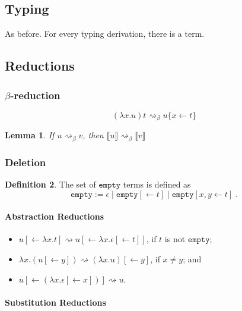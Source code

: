 \documentclass[11pt,a4paper]{article}
\theoremstyle{definition}
\newtheorem{definition}{Definition}
\theoremstyle{plain}
\newtheorem{lemma}[definition]{Lemma}
\theoremstyle{remark}
\begin{document}
\subsection{Typing}

As before. For every typing derivation, there is a term.

\subsection{Reductions}

\subsubsection{$\beta$-reduction}

\[
(\lambda x.u)t \rightsquigarrow_\beta u\{x\leftarrow t\}
\]


\begin{lemma}
	If $u\rightsquigarrow_\beta v$, then $\llbracket u\rrbracket \rightsquigarrow_\beta\llbracket v\rrbracket$
\end{lemma}

\subsubsection{Deletion}

\newcommand{\tempty}{{\mathtt{empty}}}

\begin{definition}
	The set of $\tempty$ terms is defined as
	\[\tempty:=\epsilon\;|\;\tempty[\leftarrow t]\;|\;\tempty[x,y\leftarrow t]\;.\]
\end{definition}

\paragraph{Abstraction Reductions}

\begin{itemize}
	\item $u[\leftarrow\lambda x.t]\rightsquigarrow u[\leftarrow\lambda x.\epsilon[\leftarrow t]]$, if $t$ is not $\tempty$;
	\item $\lambda x.(u[\leftarrow y])\rightsquigarrow (\lambda x.u)[\leftarrow y]$, if $x\neq y$; and
	\item $u[\leftarrow(\lambda x.\epsilon[\leftarrow x])]\rightsquigarrow u$.
\end{itemize}

\paragraph{Substitution Reductions}
\end{document}
